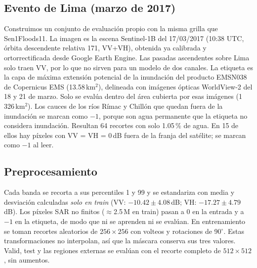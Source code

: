 \subsection{Evento de Lima (marzo de 2017)}
Construimos un conjunto de evaluación propio con la misma grilla que Sen1Floods11. La imagen es
la escena Sentinel-1B del 17/03/2017 (10:38 UTC, órbita descendente relativa 171, VV+VH),
obtenida ya calibrada y ortorrectificada desde Google Earth Engine. Las pasadas ascendentes
sobre Lima solo traen VV, por lo que no sirven para un modelo de dos canales. La etiqueta es la
capa de máxima extensión potencial de la inundación del producto EMSN038 de Copernicus EMS
(13.58\,km$^2$), delineada con imágenes ópticas WorldView-2 del 18 y 21 de marzo. Solo se
evalúa dentro del área cubierta por esas imágenes (1\,326\,km$^2$). Los cauces de los ríos Rímac
y Chillón que quedan fuera de la inundación se marcan como $-1$, porque son agua permanente que
la etiqueta no considera inundación. Resultan 64 recortes con solo 1.05\,\% de agua. En 15 de
ellos hay píxeles con VV = VH = 0\,dB fuera de la franja del satélite; se marcan como $-1$ al
leer.

\subsection{Preprocesamiento}
Cada banda se recorta a sus percentiles 1 y 99 y se estandariza con media y desviación
calculadas \emph{solo en train} (VV: $-10.42\pm4.08$\,dB; VH: $-17.27\pm4.79$\,dB). Los píxeles
SAR no finitos ($\approx$2.5\,M en train) pasan a 0 en la entrada y a $-1$ en la etiqueta, de
modo que ni se aprenden ni se evalúan. En entrenamiento se toman recortes aleatorios de
$256\times256$ con volteos y rotaciones de 90$^\circ$. Estas transformaciones no interpolan, así
que la máscara conserva sus tres valores. Valid, test y las regiones externas se evalúan con el
recorte completo de $512\times512$, sin aumentos.
